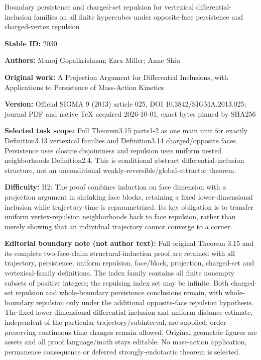 \documentclass[11pt]{article}
\begin{document}
\begin{center}\Large Boundary persistence and charged-set repulsion for vertexical differential-inclusion families on all finite hypercubes under opposite-face persistence and charged-vertex repulsion\end{center}
\noindent\textbf{Stable ID:} 2030\par
\noindent\textbf{Authors:} Manoj Gopalkrishnan; Ezra Miller; Anne Shiu\par
\noindent\textbf{Original work:} A Projection Argument for Differential Inclusions, with Applications to Persistence of Mass-Action Kinetics\par
\noindent\textbf{Version:} Official SIGMA 9 (2013) article 025, DOI 10.3842/SIGMA.2013.025; journal PDF and native TeX acquired 2026-10-01, exact bytes pinned by SHA256\par
\noindent\textbf{Selected task scope:} Full Theorem3.15 parts1-2 as one main unit for exactly Definition3.13 vertexical families and Definition3.14 charged/opposite faces. Persistence uses closure disjointness and repulsion uses uniform nested neighborhoods Definition2.4. This is conditional abstract differential-inclusion structure, not an unconditional weakly-reversible/global-attractor theorem.\par
\noindent\textbf{Difficulty:} H2: The proof combines induction on face dimension with a projection argument in shrinking face blocks, retaining a fixed lower-dimensional inclusion while trajectory time is reparametrized. Its key obligation is to transfer uniform vertex-repulsion neighborhoods back to face repulsion, rather than merely showing that an individual trajectory cannot converge to a corner.\par
\noindent\textbf{Editorial boundary note (not author text):} Full original Theorem 3.15 and its complete two-face-claim structural-induction proof are retained with all trajectory, persistence, uniform repulsion, face/block, projection, charged-set and vertexical-family definitions. The index family contains all finite nonempty subsets of positive integers; the repulsing index set may be infinite. Both charged-set repulsion and whole-boundary persistence conclusions remain, with whole-boundary repulsion only under the additional opposite-face repulsion hypothesis. The fixed lower-dimensional differential inclusion and uniform distance estimate, independent of the particular trajectory/subinterval, are supplied; order-preserving continuous time changes remain allowed. Original geometric figures are assets and all proof language/math stays editable. No mass-action application, permanence consequence or deferred strongly-endotactic theorem is selected.\par
\end{document}
